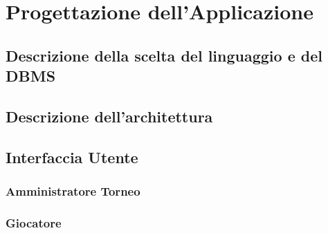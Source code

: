 \documentclass[a4paper,12pt]{report}
\begin{document}
\chapter{Progettazione dell'Applicazione}
\section{Descrizione della scelta del linguaggio e del DBMS}
\section{Descrizione dell'architettura}
\section{Interfaccia Utente}
\subsection{Amministratore Torneo}
\subsection{Giocatore}
\end{document}
